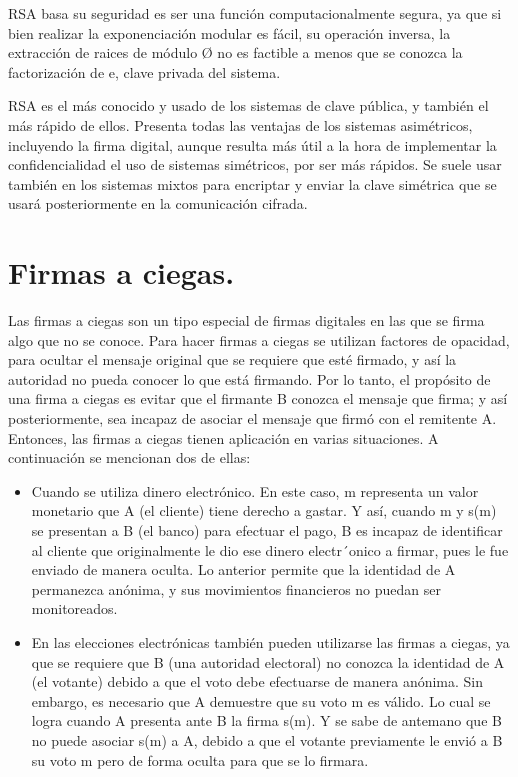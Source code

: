 RSA basa su seguridad es ser una función computacionalmente segura, ya que si bien realizar la exponenciación modular es fácil, su operación inversa, la extracción de raices de módulo Ø no es factible a menos que se conozca la factorización de e, clave privada del sistema.

RSA es el más conocido y usado de los sistemas de clave pública, y también el más rápido de ellos. Presenta todas las ventajas de los sistemas asimétricos, incluyendo la firma digital, aunque resulta más útil a la hora de implementar la confidencialidad el uso de sistemas simétricos, por ser más rápidos. Se suele usar también en los sistemas mixtos para encriptar y enviar la clave simétrica que se usará posteriormente en la comunicación cifrada. ~\cite{rsa}

\section{Firmas a ciegas. }

Las firmas a ciegas son un tipo especial de firmas digitales en las que se firma algo que no se conoce. Para hacer firmas a ciegas se utilizan factores de opacidad, para ocultar el mensaje original que se requiere que esté firmado, y así la autoridad no pueda conocer lo que está firmando.
Por lo tanto, el propósito de una firma a ciegas es evitar que el firmante B conozca el mensaje que firma; y así posteriormente, sea incapaz de asociar el mensaje que firmó con el remitente A. Entonces, las firmas a ciegas tienen aplicación en varias situaciones. A continuación se mencionan dos de ellas:
\begin{itemize}
	\item Cuando se utiliza dinero electrónico. En este caso, m representa un valor monetario que A (el cliente) tiene derecho a gastar. Y así, cuando m y s(m) se presentan a B (el banco) para efectuar el pago, B es incapaz de identificar al cliente que originalmente le dio ese dinero electr´onico a firmar, pues le fue enviado de manera oculta. Lo anterior permite que la identidad de A permanezca anónima, y sus movimientos financieros no puedan ser monitoreados.
	\item En las elecciones electrónicas también pueden utilizarse las firmas a ciegas, ya que se requiere que B (una autoridad electoral) no conozca la identidad de A (el votante) debido a que el voto debe efectuarse de manera anónima. Sin embargo, es necesario que A demuestre que su voto m es válido. Lo cual se logra cuando A presenta ante B la firma s(m). Y se sabe de antemano que B no puede asociar s(m) a A, debido a que el votante previamente le envió a B su voto m pero de forma oculta para que se lo firmara. ~\cite{ciegas}
\end{itemize} 

